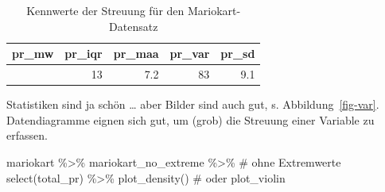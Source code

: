 \documentclass[
  letterpaper,
  twoside,
  open=any]{scrbook}
\newenvironment{Shaded}{\begin{snugshade}}{\end{snugshade}}
\newcommand{\CommentTok}[1]{\textcolor[rgb]{0.37,0.37,0.37}{#1}}
\newcommand{\FunctionTok}[1]{\textcolor[rgb]{0.28,0.35,0.67}{#1}}
\newcommand{\NormalTok}[1]{\textcolor[rgb]{0.00,0.23,0.31}{#1}}
\newcommand{\SpecialCharTok}[1]{\textcolor[rgb]{0.37,0.37,0.37}{#1}}
\theoremstyle{definition}
\theoremstyle{definition}
\theoremstyle{definition}
\theoremstyle{remark}
\begin{document}
\begin{longtable}[]{@{}rrrrr@{}}

\caption{\label{tbl-mario-streu}Kennwerte der Streuung für den
Mariokart-Datensatz}

\tabularnewline

\toprule\noalign{}
pr\_mw & pr\_iqr & pr\_maa & pr\_var & pr\_sd \\
\midrule\noalign{}
\endhead
\bottomrule\noalign{}
\endlastfoot
47 & 13 & 7.2 & 83 & 9.1 \\

\end{longtable}

Statistiken sind ja schön \ldots{} aber Bilder sind auch gut, s.
Abbildung~\ref{fig-var}. Datendiagramme eignen sich gut, um (grob) die
Streuung einer Variable zu erfassen.

\begin{Shaded}
\begin{Highlighting}[]
\NormalTok{mariokart }\SpecialCharTok{\%\textgreater{}\%} 
\NormalTok{  mariokart\_no\_extreme }\SpecialCharTok{\%\textgreater{}\%}   \CommentTok{\# ohne Extremwerte}
  \FunctionTok{select}\NormalTok{(total\_pr) }\SpecialCharTok{\%\textgreater{}\%} 
  \FunctionTok{plot\_density}\NormalTok{()  }\CommentTok{\# oder plot\_violin}
\end{Highlighting}
\end{Shaded}
\end{document}
